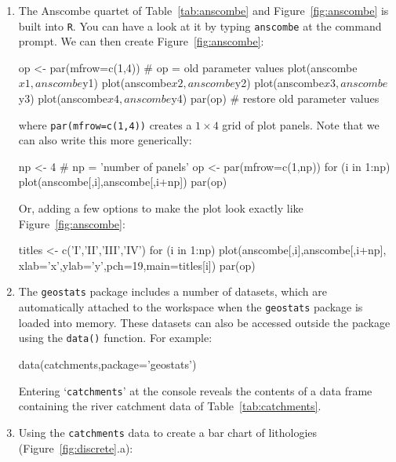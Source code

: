 \begin{enumerate}

\item\label{it:anscombe} The Anscombe quartet of
  Table~\ref{tab:anscombe} and Figure~\ref{fig:anscombe} is built into
  \texttt{R}. You can have a look at it by typing \texttt{anscombe} at
  the command prompt. We can then create Figure~\ref{fig:anscombe}:

\begin{script}
op <- par(mfrow=c(1,4)) # op = old parameter values
plot(anscombe$x1,anscombe$y1)
plot(anscombe$x2,anscombe$y2)
plot(anscombe$x3,anscombe$y3)
plot(anscombe$x4,anscombe$y4)
par(op)                 # restore old parameter values
\end{script}

\noindent where \texttt{par(mfrow=c(1,4))} creates a $1\times{4}$ grid
of plot panels. Note that we can also write this more generically:

\begin{script}
np <- 4 # np = 'number of panels'
op <- par(mfrow=c(1,np))
for (i in 1:np){
  plot(anscombe[,i],anscombe[,i+np])
}
par(op)
\end{script}

Or, adding a few options to make the plot look exactly like
Figure~\ref{fig:anscombe}:

\begin{script}[firstnumber=3]
titles <- c('I','II','III','IV')
for (i in 1:np){
  plot(anscombe[,i],anscombe[,i+np],
       xlab='x',ylab='y',pch=19,main=titles[i])
}
par(op)
\end{script}

\item The \texttt{geostats} package includes a number of datasets,
  which are automatically attached to the workspace when the
  \texttt{geostats} package is loaded into memory. These datasets can
  also be accessed outside the package using the \texttt{data()}
  function.  For example:

\begin{console}
data(catchments,package='geostats')
\end{console}

  Entering `\texttt{catchments}' at the console reveals the contents
  of a data frame containing the river catchment data of
  Table~\ref{tab:catchments}.
  
\item Using the \texttt{catchments} data to create a bar chart of
  lithologies (Figure~\ref{fig:discrete}.a):


\end{enumerate}
